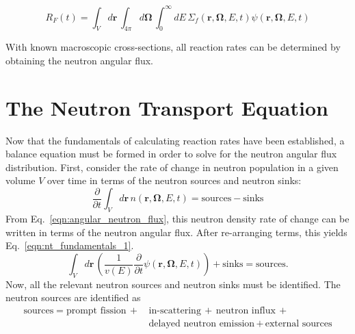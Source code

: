 \begin{equation}
R_{F}(t) = \int_{V} d\mathbf{r} \,  \int_{4\pi} d\mathbf{\Omega} \, \int_{0}^{\infty} dE \, \Sigma_f(\mathbf{r}, \mathbf{\Omega}, E, t) \psi(\mathbf{r}, \mathbf{\Omega}, E, t)
\label{eqn:rr_psi}
\end{equation}

With known macroscopic cross-sections, all reaction rates can be determined by obtaining the neutron angular flux.

\section{The Neutron Transport Equation}
\label{sec:transport-eq}

Now that the fundamentals of calculating reaction rates have been established, a balance equation must be formed in order to solve for the neutron angular flux distribution. First, consider the rate of change in neutron population in a given volume $V$ over time in terms of the neutron sources and neutron sinks:
\begin{equation}
\frac{\partial}{\partial t} \int_V d\mathbf{r} \, n(\mathbf{r},\mathbf{\Omega},E,t) = \text{sources} - \text{sinks}
\end{equation}
From Eq.~\ref{eqn:angular_neutron_flux}, this neutron density rate of change can be written in terms of the neutron angular flux. After re-arranging terms, this yields Eq.~\ref{eqn:nt_fundamentals_1}.
\begin{equation}
\int_V d\mathbf{r} \, \left( \frac{1}{v(E)} \frac{\partial}{\partial t} \psi(\mathbf{r},\mathbf{\Omega},E,t)\right) + \text{sinks} = \text{sources}.
\label{eqn:nt_fundamentals_1}
\end{equation}
Now, all the relevant neutron sources and neutron sinks must be identified. The neutron sources are identified as
\begin{equation}
\begin{split}
\text{sources} = \text{prompt fission} \, + \, & \text{in-scattering} \, +  \, \text{neutron influx} \, + \\ & \text{delayed neutron emission} \, + \, \text{external sources} \\
\end{split}
\end{equation}
